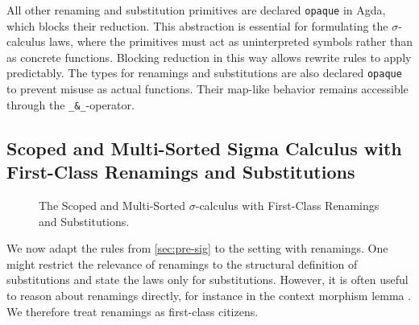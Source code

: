 \documentclass[screen,nonacm]{acmart}
\begin{document}
All other renaming and substitution primitives are declared \texttt{opaque} in
Agda, which blocks their reduction. This abstraction is essential for
formulating the $\sigma$-calculus laws, where the primitives must act as
uninterpreted symbols rather than as concrete functions. Blocking reduction in
this way allows rewrite rules to apply predictably. The types for renamings and
substitutions are also declared \texttt{opaque} to prevent misuse as actual
functions. Their map-like behavior remains accessible through the
\texttt{\_\&\_}-operator.

\subsection{Scoped and Multi-Sorted Sigma Calculus with First-Class Renamings and Substitutions}\label{sec:mis-sig}
\begin{figure}[t]
      \centering

      \begin{minipage}[t]{0.38\linewidth}
            \raggedright{}
            \EDefLaws{}
            \ERewriteSys{}
      \end{minipage}
      \hfill
      \begin{minipage}[t]{0.58\linewidth}
            \raggedright{}
            \EInteractLaws{}
            \EMonadLaws{}
      \end{minipage}

      \caption{The Scoped and Multi-Sorted $\sigma$-calculus with First-Class Renamings and Substitutions.}
      \label{fig:mis-sig}
\end{figure}

We now adapt the rules from \cref{sec:pre-sig} to the setting with renamings.
One might restrict the relevance of renamings to the structural definition of
substitutions and state the laws only for substitutions. However, it is often
useful to reason about renamings directly, for instance in the context morphism
lemma \cite{...}. We therefore treat renamings as first-class citizens.
\end{document}
